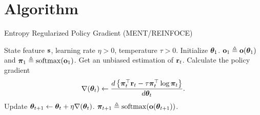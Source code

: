 \section{Algorithm}

\begin{algorithm}[h]
\caption{Entropy Regularized Policy Gradient (MENT/REINFOCE)}
\label{alg:erpg_ment_reinforce}
\begin{algorithmic}
    State feature ${\mathbf{s}}$, learning rate $\eta > 0$, temperature $\tau > 0$.
   \STATE Initialize ${\boldsymbol{\theta}}_1$. ${\mathbf{o}}_1 \triangleq {\mathbf{o}}({\boldsymbol{\theta}}_1)$ and ${\boldsymbol{\pi}}_1 \triangleq \mathrm{softmax}({\mathbf{o}}_1)$.
   \STATE Get an unbiased estimation of ${\mathbf{r}}_t$.
   \STATE Calculate the policy gradient 
   \begin{equation*}
       \nabla{({\boldsymbol{\theta}}_t)} \gets \frac{d \left\{ {\boldsymbol{\pi}}_t^\top {\mathbf{r}}_t  - \tau {\boldsymbol{\pi}}_t^\top \log{{\boldsymbol{\pi}}_t} \right\}}{d {\boldsymbol{\theta}}_t}.
   \end{equation*}
   \STATE Update ${\boldsymbol{\theta}}_{t+1} \gets {\boldsymbol{\theta}}_{t} + \eta \nabla{({\boldsymbol{\theta}}_t)}$. ${\boldsymbol{\pi}}_{t+1} \triangleq \mathrm{softmax}( {\mathbf{o}}({\boldsymbol{\theta}}_{t+1}) )$.
   \ENDFOR
\end{algorithmic}
\end{algorithm}
